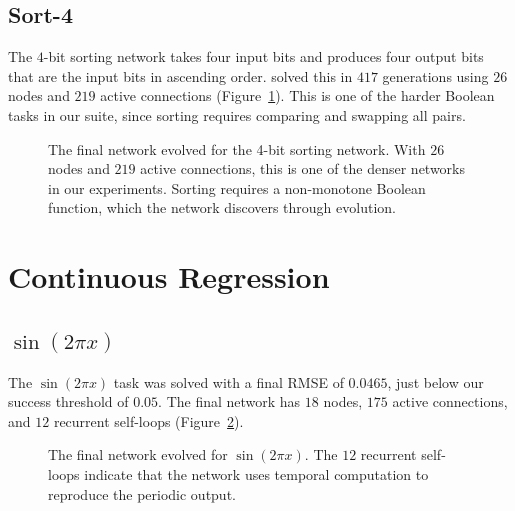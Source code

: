 \subsection{Sort-4}
\label{sec:results-sort}

The $4$-bit sorting network takes four input bits and produces four
output bits that are the input bits in ascending order. \modnet{}
solved this in $417$ generations using $26$ nodes and $219$ active
connections (Figure~\ref{fig:sort4-spring}). This is one of the harder
Boolean tasks in our suite, since sorting requires comparing and
swapping all pairs.

\begin{figure}[h]
  \centering
  \caption{The final network evolved for the 4-bit sorting network.
    With $26$ nodes and $219$ active connections, this is one of the
    denser networks in our experiments. Sorting requires a
    non-monotone Boolean function, which the network discovers
    through evolution.}
  \label{fig:sort4-spring}
\end{figure}

\section{Continuous Regression}
\label{sec:results-regression}

\subsection{$\sin(2\pi x)$}
\label{sec:results-sin2pi}

The $\sin(2\pi x)$ task was solved with a final RMSE of $0.0465$,
just below our success threshold of $0.05$. The final network has
$18$ nodes, $175$ active connections, and $12$ recurrent self-loops
(Figure~\ref{fig:sin2pi-spring}).

\begin{figure}[h]
  \centering
  \caption{The final network evolved for $\sin(2\pi x)$. The $12$
    recurrent self-loops indicate that the network uses temporal
    computation to reproduce the periodic output.}
  \label{fig:sin2pi-spring}
\end{figure}

